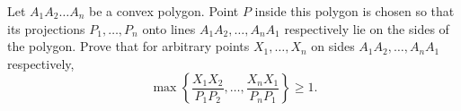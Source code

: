 Let $A_1A_2 \ldots A_n$ be a convex polygon. Point $P$ inside this polygon is chosen so that its projections $P_1, \ldots, P_n$ onto lines $A_1A_2, \ldots, A_nA_1$ respectively lie on the sides of the polygon. Prove that for arbitrary points $X_1, \ldots, X_n$ on sides $A_1A_2, \ldots, A_nA_1$ respectively,
\[
\max\left\{ \frac{X_1X_2}{P_1P_2}, \ldots, \frac{X_nX_1}{P_nP_1} \right\} \geq 1.
\]
